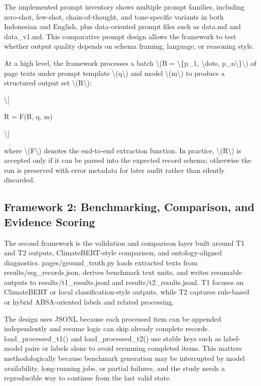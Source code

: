 The implemented prompt inventory shows multiple prompt families, including zero-shot, few-shot, chain-of-thought, and tone-specific variants in both Indonesian and English, plus data-oriented prompt files such as data.md and data\_v1.md. This comparative prompt design allows the framework to test whether output quality depends on schema framing, language, or reasoning style.

At a high level, the framework processes a batch \textbackslash{}(B = \textbackslash{}\{p\_1, \textbackslash{}dots, p\_n\textbackslash{}\}\textbackslash{}) of page texts under prompt template \textbackslash{}(q\textbackslash{}) and model \textbackslash{}(m\textbackslash{}) to produce a structured output set \textbackslash{}(R\textbackslash{}):

\textbackslash{}[

R = F(B, q, m)

\textbackslash{}]

where \textbackslash{}(F\textbackslash{}) denotes the end-to-end extraction function. In practice, \textbackslash{}(R\textbackslash{}) is accepted only if it can be parsed into the expected record schema; otherwise the run is preserved with error metadata for later audit rather than silently discarded.

\subsection{Framework 2: Benchmarking, Comparison, and Evidence Scoring}

The second framework is the validation and comparison layer built around T1 and T2 outputs, ClimateBERT-style comparison, and ontology-aligned diagnostics. pages/ground\_truth.py loads extracted texts from results/esg\_records.json, derives benchmark text units, and writes resumable outputs to results/t1\_results.jsonl and results/t2\_results.jsonl. T1 focuses on ClimateBERT or local classification-style outputs, while T2 captures rule-based or hybrid ABSA-oriented labels and related processing.

The design uses JSONL because each processed item can be appended independently and resume logic can skip already complete records. load\_processed\_t1() and load\_processed\_t2() use stable keys such as label-model pairs or labels alone to avoid rerunning completed items. This matters methodologically because benchmark generation may be interrupted by model availability, long-running jobs, or partial failures, and the study needs a reproducible way to continue from the last valid state.

